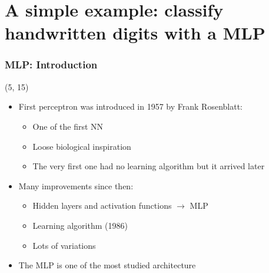 \section[A simple example: MLP]{A simple example: classify handwritten digits with a \acl{MLP}}

\begin{frame}

  \frametitle{\acl{MLP}: Introduction}

  \begin{textblock}{55}(5, 15)
    \begin{itemize}
    \item<1-> First perceptron was introduced in 1957 by Frank Rosenblatt:
      \begin{itemize}
      \item One of the first \acl{NN}
      \item Loose biological inspiration
      \item The very first one had no learning algorithm but it arrived later
      \end{itemize}
    \item<2-> Many improvements since then:
      \begin{itemize}
      \item Hidden layers and activation functions $\rightarrow$ \ac{MLP}
      \item Learning algorithm (1986)
      \item Lots of variations
      \end{itemize}
    \item<3-> The \ac{MLP} is one of the most studied architecture
    \end{itemize}
  \end{textblock}


\end{frame}
